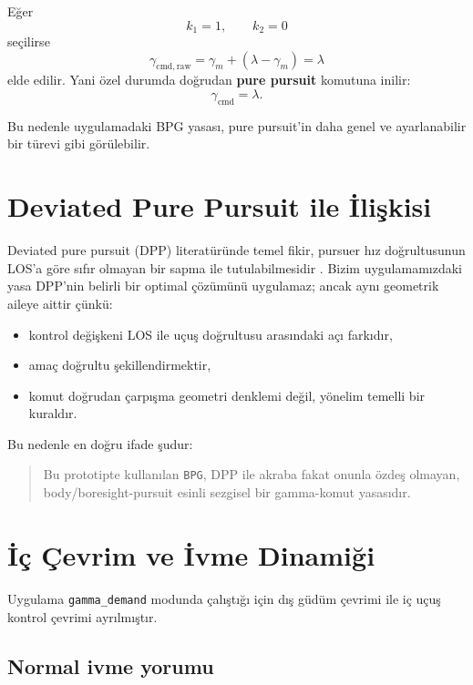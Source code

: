 \documentclass[11pt,a4paper]{article}
\begin{document}
Eğer
\begin{equation}
k_1 = 1, \qquad k_2 = 0
\end{equation}
seçilirse
\begin{equation}
\gamma_{\mathrm{cmd,raw}} = \gamma_m + (\lambda-\gamma_m) = \lambda
\end{equation}
elde edilir. Yani özel durumda doğrudan \textbf{pure pursuit} komutuna inilir:
\begin{equation}
\gamma_{\mathrm{cmd}} = \lambda.
\end{equation}

Bu nedenle uygulamadaki BPG yasası, pure pursuit'in daha genel ve ayarlanabilir bir türevi gibi görülebilir.

\section{Deviated Pure Pursuit ile İlişkisi}

Deviated pure pursuit (DPP) literatüründe temel fikir, pursuer hız doğrultusunun LOS'a göre sıfır olmayan bir sapma ile tutulabilmesidir \cite{livermore2018dpp}. Bizim uygulamamızdaki yasa DPP'nin belirli bir optimal çözümünü uygulamaz; ancak aynı geometrik aileye aittir çünkü:
\begin{itemize}[leftmargin=1.2cm]
  \item kontrol değişkeni LOS ile uçuş doğrultusu arasındaki açı farkıdır,
  \item amaç doğrultu şekillendirmektir,
  \item komut doğrudan çarpışma geometri denklemi değil, yönelim temelli bir kuraldır.
\end{itemize}

Bu nedenle en doğru ifade şudur:
\begin{quote}
Bu prototipte kullanılan \texttt{BPG}, DPP ile akraba fakat onunla özdeş olmayan, body/boresight-pursuit esinli sezgisel bir gamma-komut yasasıdır.
\end{quote}

\section{İç Çevrim ve İvme Dinamiği}

Uygulama \texttt{gamma\_demand} modunda çalıştığı için dış güdüm çevrimi ile iç uçuş kontrol çevrimi ayrılmıştır.

\subsection{Normal ivme yorumu}
\end{document}
